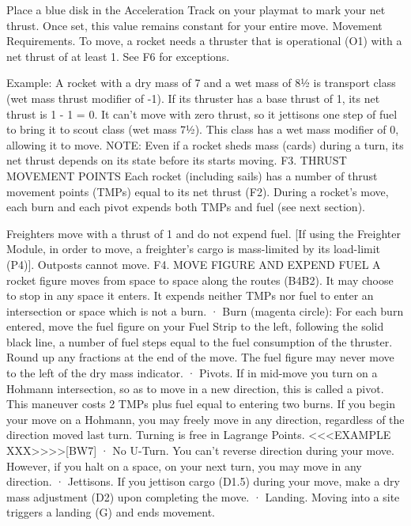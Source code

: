 \documentclass[a4paper]{book}
\begin{document}
Place a blue disk in the Acceleration Track on your playmat to mark your net thrust. Once set, this value remains constant for your entire move.
 Movement Requirements. To move, a rocket needs a thruster that is operational (O1) with a net thrust of at least 1. See F6 for exceptions.

Example: A rocket with a dry mass of 7 and a wet mass of 8½ is transport class (wet mass thrust modifier of -1). If its thruster has a base thrust of 1, its net thrust is 1 - 1 = 0. It can’t move with zero thrust, so it jettisons one step of fuel to bring it to scout class (wet mass 7½). This class has a wet mass modifier of 0, allowing it to move.
NOTE: Even if a rocket sheds mass (cards) during a turn, its net thrust depends on its state before its starts moving.
F3. THRUST MOVEMENT POINTS
Each rocket (including sails) has a number of thrust movement points (TMPs) equal to its net thrust (F2). During a rocket’s move, each burn and each pivot expends both TMPs and fuel (see next section).

Freighters move with a thrust of 1 and do not expend fuel. [If using the Freighter Module, in order to move, a freighter’s cargo is mass-limited by its load-limit (P4)].
Outposts cannot move.
F4. MOVE FIGURE AND EXPEND FUEL
A rocket figure moves from space to space along the routes (B4B2). It may choose to stop in any space it enters. It expends neither TMPs nor fuel to enter an intersection or space which is not a burn.
·       Burn (magenta circle): For each burn entered, move the fuel figure on your Fuel Strip to the left, following the solid black line, a number of fuel steps equal to the fuel consumption of the thruster. Round up any fractions at the end of the move. The fuel figure may never move to the left of the dry mass indicator.
·       Pivots. If in mid-move you turn on a Hohmann intersection, so as to move in a new direction, this is called a pivot. This maneuver costs 2 TMPs plus fuel equal to entering two burns. If you begin your move on a Hohmann, you may freely move in any direction, regardless of the direction moved last turn. Turning is free in Lagrange Points. <<<EXAMPLE XXX>>>>[BW7] 
·       No U-Turn. You can’t reverse direction during your move. However, if you halt on a space, on your next turn, you may move in any direction.
·       Jettisons. If you jettison cargo (D1.5) during your move, make a dry mass adjustment (D2) upon completing the move.
·       Landing. Moving into a site triggers a landing (G) and ends movement.
\end{document}
